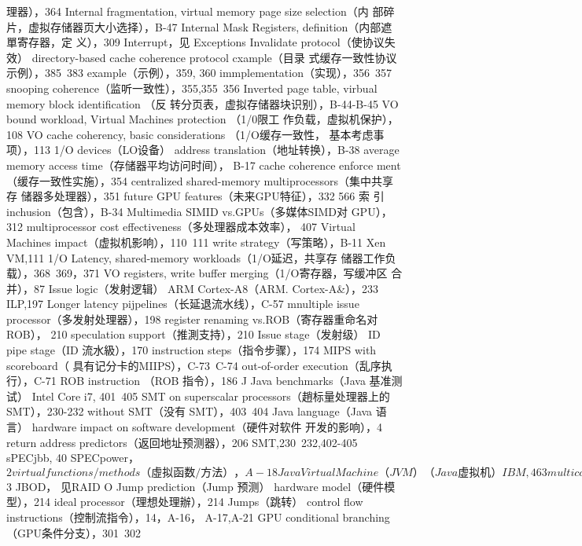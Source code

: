 理器），364
Internal fragmentation, virtual memory page size selection（内
部碎片，虚拟存储器页大小选择），B-47
Internal Mask Registers, definition（内部遮單寄存器，定
义），309
Interrupt，见 Exceptions
Invalidate protocol（使协议失效）
directory-based cache coherence protocol cxample（目录
式缓存一致性协议示例），385~383
example（示例），359, 360
immplementation（实现），356~357
snooping coherence（监听一致性），355,355~356
Inverted page table, virbual memory block identification （反
转分页表，虚拟存储器块识别），B-44-B-45
VO bound workload, Virtual Machines protection （1/0限工
作负载，虚拟机保护），108
VO cache coherency, basic considerations （1/O缓存一致性，
基本考虑事项），113
1/O devices（LO设备）
address translation（地址转换），B-38
average memory access time（存储器平均访问时间），
B-17
cache coherence enforce ment（缓存一致性实施），354
centralized shared-memory multiprocessors（集中共享存
储器多处理器），351
future GPU features（未来GPU特征），332
566
索
引
inchusion（包含），B-34
Multimedia SIMID vs.GPUs（多媒体SIMD对 GPU），
312
multiprocessor cost effectiveness（多处理器成本效率），
407
Virtual Machines impact（虚拟机影响），110~111
write strategy（写策略），B-11
Xen VM,111
1/O Latency, shared-memory workloads（1/O延迟，共享存
储器工作负载），368~369，371
VO registers, write buffer merging（1/O寄存器，写缓冲区
合并），87
Issue logic（发射逻辑）
ARM Cortex-A8（ARM. Cortex-A&），233
ILP,197
Longer latency pijpelines（长延退流水线），C-57
mnultiple issue processor（多发射处理器），198
register renaming vs.ROB（寄存器重命名对ROB），
210
speculation support（推測支持），210
Issue stage（发射级）
ID pipe stage（ID 流水級），170
instruction steps（指令步骤），174
MIPS with scoreboard（ 具有记分卡的MIIPS），C-73~C-74
out-of-order execution（乱序执行），C-71
ROB instruction （ROB 指令），186
J
Java benchmarks（Java 基准测试）
Intel Core i7, 401~405
SMT on superscalar processors（趙标量处理器上的
SMT），230-232
without SMT（没有 SMT），403~404
Java language（Java 语言）
hardware impact on software development（硬件对软件
开发的影响），4
return address predictors（返回地址预测器），206
SMT,230~232,402-405
sPECjbb, 40
SPECpower，$2
virtual functions/methods（虛拟函数/方法），A-18
Java Virtual Machine （JVM）（Java 虚拟机）
IBM,463
multicore processor performance（微处理器性能），400
multithreading-based speedup（基于多线程的加速比），
232
SPECjibb，$3
JBOD， 见RAID O
Jump prediction（Jump 预测）
hardware model（硬件模型），214
ideal processor（理想处理辦），214
Jumps（跳转）
control flow instructions（控制流指令），14，A-16，
A-17,A-21
GPU conditional branching（GPU条件分支），301~302
